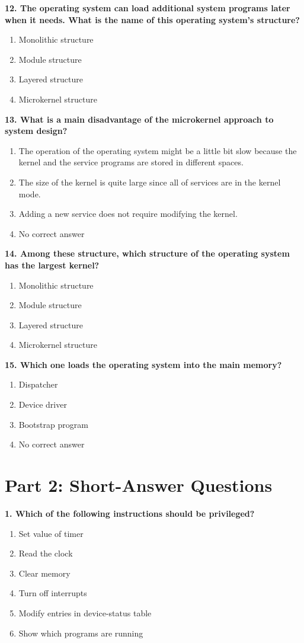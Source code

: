 \documentclass[12pt]{article}
\begin{document}
\noindent \textbf{12. The operating system can load additional system programs later when it needs. What is the name of this operating system’s structure?}
\begin{enumerate}[label=\alph*)]
\item Monolithic structure
\item Module structure
\item Layered structure
\item Microkernel structure
\end{enumerate} \vspace{15pt}
\noindent \textbf{13. What is a main disadvantage of the microkernel approach to system design?}
\begin{enumerate}[label=\alph*)]
    \item The operation of the operating system might be a little bit slow because the kernel and the service programs are stored in different spaces.
    \item The size of the kernel is quite large since all of services are in the kernel mode.
    \item Adding a new service does not require modifying the kernel.
    \item No correct answer
\end{enumerate} \vspace{15pt}

\noindent \textbf{14. Among these structure, which structure of the operating system has the largest kernel?}
\begin{enumerate}[label=\alph*)]
\item Monolithic structure
\item Module structure
\item Layered structure
\item Microkernel structure
\end{enumerate} \vspace{15pt}
\newpage
\noindent \textbf{15. Which one loads the operating system into the main memory?}
\begin{enumerate}[label=\alph*)]
\item Dispatcher
\item Device driver
\item Bootstrap program
\item No correct answer
\end{enumerate} \vspace{15pt}
\newpage
\section*{Part 2: Short-Answer Questions}
\noindent \textbf{1. Which of the following instructions should be privileged?}
\begin{enumerate}[label=\alph*)]
    \item Set value of timer
    \item Read the clock
    \item Clear memory
    \item Turn off interrupts
    \item Modify entries in device-status table
    \item Show which programs are running
\end{enumerate} 
\end{document}

